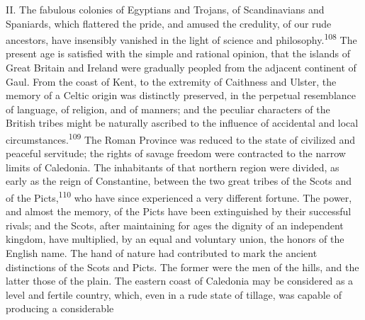 


II. The fabulous colonies of Egyptians and Trojans, of
Scandinavians and Spaniards, which flattered the pride, and
amused the credulity, of our rude ancestors, have insensibly
vanished in the light of science and philosophy.\textsuperscript{108} The present
age is satisfied with the simple and rational opinion, that the
islands of Great Britain and Ireland were gradually peopled from
the adjacent continent of Gaul. From the coast of Kent, to the
extremity of Caithness and Ulster, the memory of a Celtic origin
was distinctly preserved, in the perpetual resemblance of
language, of religion, and of manners; and the peculiar
characters of the British tribes might be naturally ascribed to
the influence of accidental and local circumstances.\textsuperscript{109} The
Roman Province was reduced to the state of civilized and peaceful
servitude; the rights of savage freedom were contracted to the
narrow limits of Caledonia. The inhabitants of that northern
region were divided, as early as the reign of Constantine,
between the two great tribes of the Scots and of the Picts,\textsuperscript{110}
who have since experienced a very different fortune. The power,
and almost the memory, of the Picts have been extinguished by
their successful rivals; and the Scots, after maintaining for
ages the dignity of an independent kingdom, have multiplied, by
an equal and voluntary union, the honors of the English name. The
hand of nature had contributed to mark the ancient distinctions
of the Scots and Picts. The former were the men of the hills, and
the latter those of the plain. The eastern coast of Caledonia may
be considered as a level and fertile country, which, even in a
rude state of tillage, was capable of producing a considerable
